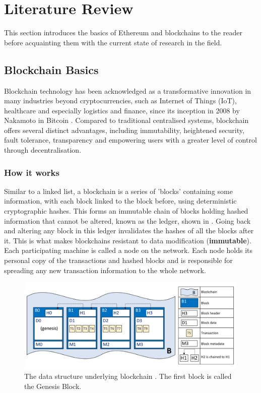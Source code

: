 \chapter{Literature Review}

This section introduces the basics of Ethereum and blockchains to the reader before acquainting them with the current state of research in the field.


\section{Blockchain Basics}

Blockchain technology has been acknowledged as a transformative innovation in many industries beyond cryptocurrencies, such as Internet of Things (IoT), healthcare and especially logistics and finance, since its inception in 2008 by Nakamoto in Bitcoin \cite{NakamotoBitcoin:System}. Compared to traditional centralised systems, blockchain offers several distinct advantages, including immutability, heightened security, fault tolerance, transparency and empowering users with a greater level of control through decentralisation.

\subsection{How it works}

Similar to a linked list, a blockchain is a series of 'blocks' containing some information, with each block linked to the block before, using deterministic cryptographic hashes. This forms an immutable chain of blocks holding hashed information that cannot be altered, known as the ledger, shown in . Going back and altering any block in this ledger invalidates the hashes of all the blocks after it. This is what makes blockchains resistant to data modification (\textbf{immutable}). Each participating machine is called a node on the network. Each node holds its personal copy of the transactions and hashed blocks and is responsible for spreading any new transaction information to the whole network.

\begin{figure}[h]
    \centering
    \includegraphics[width=13cm,center]{Figures/BlockchainStructure.png}
    \caption{The data structure underlying blockchain \cite{ADocumentation}. The first block is called the Genesis Block.}
    \label{Figure:BasicBlockchain}
\end{figure}

